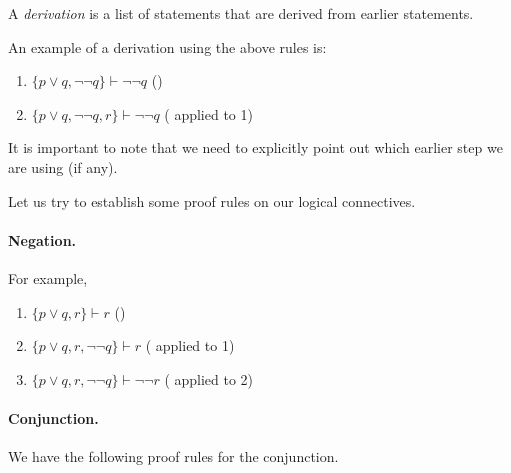 \begin{definition}
A \textit{derivation} is a list of statements that are derived from earlier statements.
\end{definition}

An example of a derivation using the above rules is:
\begin{enumerate}
	\item $\{p\vee q,\neg\neg q\}\vdash\neg\neg q$ \hfill ()
	\item $\{p\vee q, \neg\neg q, r\}\vdash\neg\neg q$ \hfill ( applied to 1)
\end{enumerate}
It is important to note that we need to explicitly point out which earlier step we are using (if any).

Let us try to establish some proof rules on our logical connectives.

\paragraph{Negation.}

\begin{prooftree}
\end{prooftree}

For example,
\begin{enumerate}
	\item $\{p\vee q,r\}\vdash r$ \hfill ()
	\item $\{p\vee q, r, \neg\neg q\}\vdash r$ \hfill ( applied to 1)
	\item $\{p\vee q, r, \neg\neg q\}\vdash\neg\neg r$ \hfill ( applied to 2)
\end{enumerate}

\paragraph{Conjunction.}

We have the following proof rules for the conjunction.

\begin{prooftree}
\end{prooftree}

\begin{prooftree}
\end{prooftree}

